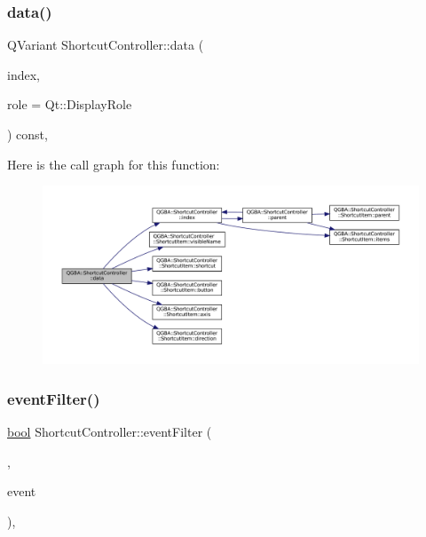 \mbox{\label{class_q_g_b_a_1_1_shortcut_controller_aaca86abde672cfa640bb16c2f18be31a}} 
\subsubsection{\texorpdfstring{data()}{data()}}
{\footnotesize\ttfamily Q\+Variant Shortcut\+Controller\+::data (\begin{DoxyParamCaption}\item[{const Q\+Model\+Index \&}]{index,  }\item[{\mbox{\hyperlink{ioapi_8h_a787fa3cf048117ba7123753c1e74fcd6}{int}}}]{role = {\ttfamily Qt\+:\+:DisplayRole} }\end{DoxyParamCaption}) const\hspace{0.3cm}{\ttfamily [override]}, {\ttfamily [virtual]}}

Here is the call graph for this function\+:
\nopagebreak
\begin{figure}[H]
\begin{center}
\leavevmode
\includegraphics[width=350pt]{class_q_g_b_a_1_1_shortcut_controller_aaca86abde672cfa640bb16c2f18be31a_cgraph}
\end{center}
\end{figure}
\mbox{\label{class_q_g_b_a_1_1_shortcut_controller_a2a9be67f97609055135ea70bfa2b5c20}} 
\subsubsection{\texorpdfstring{event\+Filter()}{eventFilter()}}
{\footnotesize\ttfamily \mbox{\hyperlink{libretro_8h_a4a26dcae73fb7e1528214a068aca317e}{bool}} Shortcut\+Controller\+::event\+Filter (\begin{DoxyParamCaption}\item[{Q\+Object $\ast$}]{,  }\item[{Q\+Event $\ast$}]{event }\end{DoxyParamCaption})\hspace{0.3cm}{\ttfamily [override]}, {\ttfamily [protected]}}

